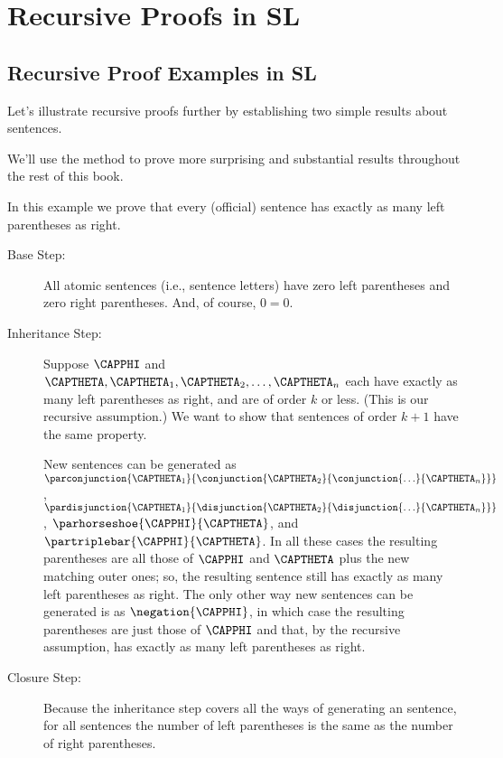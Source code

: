 \section{Recursive Proofs in SL}\label{recursive proofs in SL}

\subsection{Recursive Proof Examples in SL}

Let's illustrate recursive proofs further by establishing two simple results about \GSL{} sentences.  

We'll use the method to prove more surprising and substantial results throughout the rest of this book.
\begin{majorILnc}{} 
In this example we prove that every (official) sentence has exactly as many left parentheses as right.
\begin{PROOF}
\begin{description}
\item[Base Step:] All atomic sentences (i.e., sentence letters) have zero left parentheses and zero right parentheses. 
And, of course, $0=0$.
\item[Inheritance Step:] Suppose $\CAPPHI$ and $\CAPTHETA,\CAPTHETA_1,\CAPTHETA_2,\ldots,\CAPTHETA_{\integer{n}}$ each have exactly as many left parentheses as right, and are of order $k$ or less. 
(This is our recursive assumption.)  We want to show that sentences of order $k+1$ have the same property.


New sentences can be generated as $\parconjunction{\CAPTHETA_1}{\conjunction{\CAPTHETA_2}{\conjunction{\ldots}{\CAPTHETA_{\integer{n}}}}}$, $\pardisjunction{\CAPTHETA_1}{\disjunction{\CAPTHETA_2}{\disjunction{\ldots}{\CAPTHETA_{\integer{n}}}}}$, $\parhorseshoe{\CAPPHI}{\CAPTHETA}$, and $\partriplebar{\CAPPHI}{\CAPTHETA}$. 
In all these cases the resulting parentheses are all those of $\CAPPHI$ and $\CAPTHETA$ plus the new matching outer ones; so, the resulting sentence still has exactly as many left parentheses as right.
The only other way new sentences can be generated is as $\negation{\CAPPHI}$, in which case the resulting parentheses are just those of $\CAPPHI$ and that, by the recursive assumption, has exactly as many left parentheses as right.
\item[Closure Step:] Because the inheritance step covers all the ways of generating an \GSL{} sentence, for all \GSL{} sentences the number of left parentheses is the same as the number of right parentheses.\end{description}
\end{PROOF}
\end{majorILnc}
